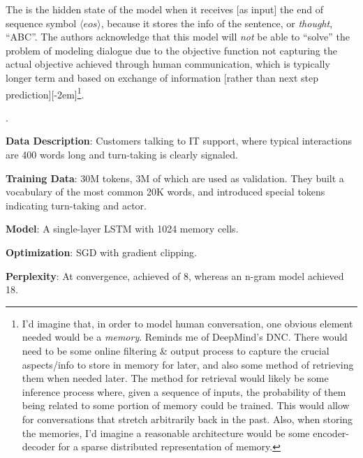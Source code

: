 \documentclass[11pt]{article}
\begin{document}
\myspace
\p The  is the hidden state of the model when it receives [as input] the end of sequence symbol $\langle eos \rangle$, because it stores the info of the sentence, or \textit{thought}, ``ABC''. The authors acknowledge that this model will \textit{not} be able to ``solve'' the problem of modeling dialogue due to the objective function not capturing the actual objective achieved through human communication, which is typically longer term and based on exchange of information [rather than next step prediction][-2em]\footnote{I'd imagine that, in order to model human conversation, one obvious element needed would be a \textit{memory}. Reminds me of DeepMind's DNC. There would need to be some online filtering \& output process to capture the crucial aspects/info to store in memory for later, and also some method of retrieving them when needed later. The method for retrieval would likely be some inference process where, given a sequence of inputs, the probability of them being related to some portion of memory could be trained. This would allow for conversations that stretch arbitrarily back in the past. Also, when storing the memories, I'd imagine a reasonable architecture would be some encoder-decoder for a sparse distributed representation of memory.}.

\myspace
\p {}.
\begin{compactitem}
	\item \textbf{Data Description}: Customers talking to IT support, where typical interactions are 400 words long and turn-taking is clearly signaled. 
	
	\item \textbf{Training Data}: 30M tokens, 3M of which are used as validation. They built a vocabulary of the most common 20K words, and introduced special tokens indicating turn-taking and actor.
	
	\item \textbf{Model}: A single-layer LSTM with 1024 memory cells. 
	
	\item \textbf{Optimization}: SGD with gradient clipping.
	
	\item \textbf{Perplexity}: At convergence, achieved  of 8, whereas an n-gram model achieved 18.
\end{compactitem}
\end{document}
